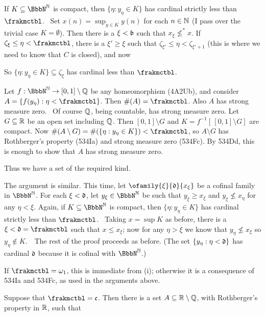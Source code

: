 {If $K\subseteq\NN$ is compact, then $\{\eta:y_{\eta}\in K\}$ has cardinal
strictly less than $\frakmctbl$.   \Prf\ Set $x(n)=\sup_{y\in K}y(n)$ for
each $n\in\Bbb N$ (I pass over the trivial case $K=\emptyset$).   Then
there is a $\xi<\frak b$ such that $x_{\xi}\not\le^*x$.   If
$\zeta_{\xi}\le\eta<\frakmctbl$, there is a $\xi'\ge\xi$ such that
$\zeta_{\xi'}\le\eta<\zeta_{\xi'+1}$ (this is where we need to know that
$C$ is closed), and now


\noindent So $\{\eta:y_{\eta}\in K\}\subseteq\zeta_{\xi}$ has cardinal less
than $\frakmctbl$.\ \Qed

Let $f:\NN\to[0,1]\setminus\Bbb Q$ be any homeomorphism (4A2Ub), and
consider $A=\{f(y_{\eta}):\eta<\frakmctbl\}$.   Then $\#(A)=\frakmctbl$.
Also $A$ has strong measure zero.   \Prf\ Of course $\Bbb Q$, being
countable, has strong measure zero.   Let $G\subseteq\Bbb R$ be an
open set including $\Bbb Q$.   Then $[0,1]\setminus G$ and
$K=f^{-1}[\,[0,1]\setminus G]$ are compact.   Now
$\#(A\setminus G)=\#(\{\eta:y_{\eta}\in K\})<\frakmctbl$, so
$A\setminus G$ has Rothberger's property (534Ia) and strong measure zero
(534Fc).   By
534Dd, this is enough to show that $A$ has strong measure zero.\ \Qed

Thus we have a set of the required kind.

\medskip

 The argument is similar.   This time, let
$\ofamily{\xi}{\frak d}{x_{\xi}}$ be a cofinal family in $\NN$.   For each
$\xi<\frak d$, let $y_{\xi}\in\NN$ be such that $y_{\xi}\ge x_{\xi}$ and
$y_{\xi}\not\le x_{\eta}$ for any $\eta<\xi$.   Again, if
$K\subseteq\NN$ is compact, then $\{\eta:y_{\eta}\in K\}$ has cardinal
strictly less than $\frakmctbl$.   \Prf\ Taking $x=\sup K$ as before,
there is a $\xi<\frak d=\frakmctbl$
such that $x\le x_{\xi}$;  now for any $\eta>\xi$
we know that $y_{\eta}\not\le x_{\xi}$ so $y_{\eta}\notin K$.\ \QeD\
The rest of the proof proceeds as before.   (The set
$\{y_{\eta}:\eta<\frak d\}$ has cardinal $\frak d$ because it is cofinal
with $\NN$.)

\medskip

 If $\frakmctbl=\omega_1$, this is immediate from (i);
otherwise it is a consequence of 534Ia and 534Fc, as used in the arguments
above.
}%

 Suppose that $\frakmctbl=\frak c$.   Then
there
is a set $A\subseteq\Bbb R\setminus\Bbb Q$, with Rothberger's property
in $\Bbb R$, such that

